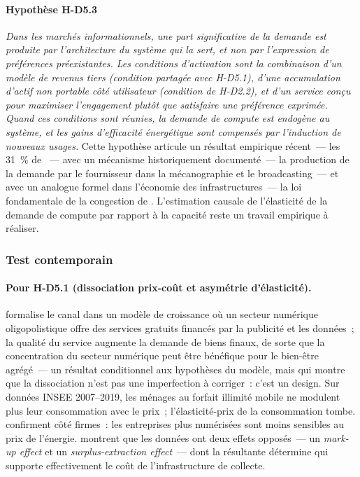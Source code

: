 \paragraph{Hypothèse H-D5.3} \emph{Dans les marchés informationnels, une part significative de la demande est produite par l'architecture du système qui la sert, et non par l'expression de préférences préexistantes. Les conditions d'activation sont la combinaison d'un modèle de revenus tiers (condition partagée avec H-D5.1), d'une accumulation d'actif non portable côté utilisateur (condition de H-D2.2), et d'un service conçu pour maximiser l'engagement plutôt que satisfaire une préférence exprimée. Quand ces conditions sont réunies, la demande de compute est endogène au système, et les gains d'efficacité énergétique sont compensés par l'induction de nouveaux usages.} Cette hypothèse articule un résultat empirique récent~--- les 31~\% de \textcite{allcott_digital_2022}~--- avec un mécanisme historiquement documenté~--- la production de la demande par le fournisseur dans la mécanographie et le broadcasting~--- et avec un analogue formel dans l'économie des infrastructures~--- la loi fondamentale de la congestion de \textcite{duranton_fundamental_2011}. L'estimation causale de l'élasticité de la demande de compute par rapport à la capacité reste un travail empirique à réaliser.


\subsubsection{Test contemporain}

\paragraph{Pour H-D5.1 (dissociation prix-coût et asymétrie d'élasticité).} \textcite{aubouin_economie_2023} formalise le canal dans un modèle de croissance où un secteur numérique oligopolistique offre des services gratuits financés par la publicité et les données~; la qualité du service augmente la demande de biens finaux, de sorte que la concentration du secteur numérique peut être bénéfique pour le bien-être agrégé~--- un résultat conditionnel aux hypothèses du modèle, mais qui montre que la dissociation n'est pas une imperfection à corriger~: c'est un design. Sur données INSEE 2007--2019, les ménages au forfait illimité mobile ne modulent plus leur consommation avec le prix~; l'élasticité-prix de la consommation tombe. \textcite{axenbeck_what_2022} confirment côté firmes~: les entreprises plus numérisées sont moins sensibles au prix de l'énergie. \textcite{de_corniere_data_2025} montrent que les données ont deux effets opposés~--- un \emph{mark-up effect} et un \emph{surplus-extraction effect}~--- dont la résultante détermine qui supporte effectivement le coût de l'infrastructure de collecte.

